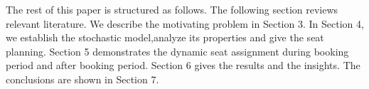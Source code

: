 


The rest of this paper is structured as follows. The following section reviews relevant literature. We describe the motivating problem in Section 3. In Section 4, we establish the stochastic model,analyze its properties and give the seat planning. Section 5 demonstrates the dynamic seat assignment during booking period and after booking period. Section 6 gives the results and the insights. The conclusions are shown in Section 7.

\newpage
